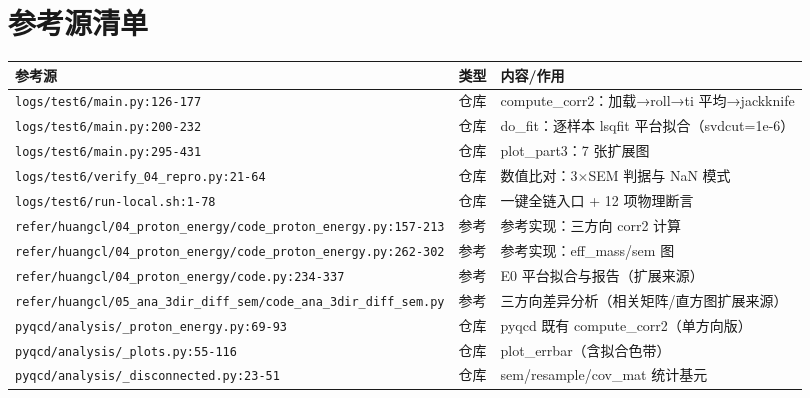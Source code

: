 \documentclass[UTF8]{ctexart}
\begin{document}
\section{参考源清单}
\begin{xltabular}{\textwidth}{llX}
\toprule
\textcolor{evidence}{参考源} & 类型 & 内容/作用 \\
\midrule
\endhead
\texttt{\nolinkurl{logs/test6/main.py:126-177}} & 仓库 & compute\_corr2：加载→roll→ti 平均→jackknife \\
\texttt{\nolinkurl{logs/test6/main.py:200-232}} & 仓库 & do\_fit：逐样本 lsqfit 平台拟合（svdcut=1e-6） \\
\texttt{\nolinkurl{logs/test6/main.py:295-431}} & 仓库 & plot\_part3：7 张扩展图 \\
\texttt{\nolinkurl{logs/test6/verify_04_repro.py:21-64}} & 仓库 & 数值比对：3$\times$SEM 判据与 NaN 模式 \\
\texttt{\nolinkurl{logs/test6/run-local.sh:1-78}} & 仓库 & 一键全链入口 + 12 项物理断言 \\
\texttt{\nolinkurl{refer/huangcl/04_proton_energy/code_proton_energy.py:157-213}} & 参考 & 参考实现：三方向 corr2 计算 \\
\texttt{\nolinkurl{refer/huangcl/04_proton_energy/code_proton_energy.py:262-302}} & 参考 & 参考实现：eff\_mass/sem 图 \\
\texttt{\nolinkurl{refer/huangcl/04_proton_energy/code.py:234-337}} & 参考 & E0 平台拟合与报告（扩展来源） \\
\texttt{\nolinkurl{refer/huangcl/05_ana_3dir_diff_sem/code_ana_3dir_diff_sem.py}} & 参考 & 三方向差异分析（相关矩阵/直方图扩展来源） \\
\texttt{\nolinkurl{pyqcd/analysis/_proton_energy.py:69-93}} & 仓库 & pyqcd 既有 compute\_corr2（单方向版） \\
\texttt{\nolinkurl{pyqcd/analysis/_plots.py:55-116}} & 仓库 & plot\_errbar（含拟合色带） \\
\texttt{\nolinkurl{pyqcd/analysis/_disconnected.py:23-51}} & 仓库 & sem/resample/cov\_mat 统计基元 \\
\bottomrule
\end{xltabular}

\end{document}
